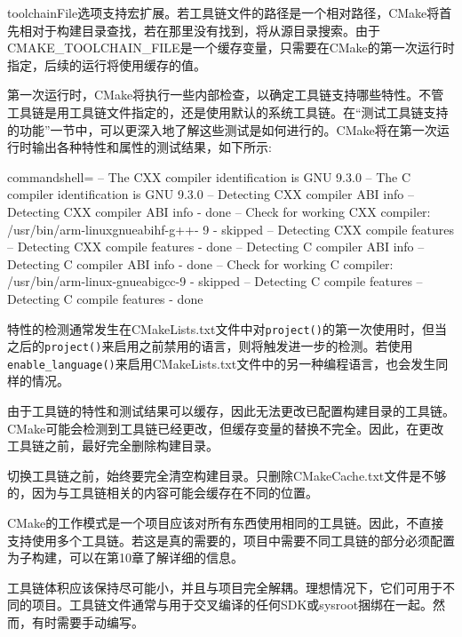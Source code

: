 toolchainFile选项支持宏扩展。若工具链文件的路径是一个相对路径，CMake将首先相对于构建目录查找，若在那里没有找到，将从源目录搜索。由于CMAKE\_TOOLCHAIN\_FILE是一个缓存变量，只需要在CMake的第一次运行时指定，后续的运行将使用缓存的值。

第一次运行时，CMake将执行一些内部检查，以确定工具链支持哪些特性。不管工具链是用工具链文件指定的，还是使用默认的系统工具链。在“测试工具链支持的功能”一节中，可以更深入地了解这些测试是如何进行的。CMake将在第一次运行时输出各种特性和属性的测试结果，如下所示:

{\footnotesize
\begin{tcblisting}{commandshell={}}
-- The CXX compiler identification is GNU 9.3.0
-- The C compiler identification is GNU 9.3.0
-- Detecting CXX compiler ABI info
-- Detecting CXX compiler ABI info - done
-- Check for working CXX compiler: /usr/bin/arm-linuxgnueabihf-g++- 9 - skipped
-- Detecting CXX compile features
-- Detecting CXX compile features - done
-- Detecting C compiler ABI info
-- Detecting C compiler ABI info - done
-- Check for working C compiler: /usr/bin/arm-linux-gnueabigcc-9 - skipped
-- Detecting C compile features
-- Detecting C compile features - done
\end{tcblisting}
}

特性的检测通常发生在CMakeLists.txt文件中对\texttt{project()}的第一次使用时，但当之后的\texttt{project()}来启用之前禁用的语言，则将触发进一步的检测。若使用\texttt{enable\_language()}来启用CMakeLists.txt文件中的另一种编程语言，也会发生同样的情况。

由于工具链的特性和测试结果可以缓存，因此无法更改已配置构建目录的工具链。CMake可能会检测到工具链已经更改，但缓存变量的替换不完全。因此，在更改工具链之前，最好完全删除构建目录。

\begin{tcolorbox}[colback=blue!5!white,colframe=blue!75!black,title=配置完成后切换工具链]
切换工具链之前，始终要完全清空构建目录。只删除CMakeCache.txt文件是不够的，因为与工具链相关的内容可能会缓存在不同的位置。
\end{tcolorbox}

CMake的工作模式是一个项目应该对所有东西使用相同的工具链。因此，不直接支持使用多个工具链。若这是真的需要的，项目中需要不同工具链的部分必须配置为子构建，可以在第10章了解详细的信息。

工具链体积应该保持尽可能小，并且与项目完全解耦。理想情况下，它们可用于不同的项目。工具链文件通常与用于交叉编译的任何SDK或sysroot捆绑在一起。然而，有时需要手动编写。












